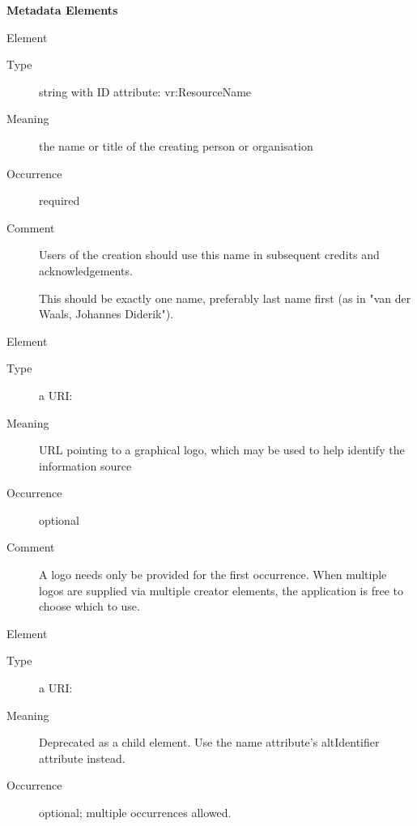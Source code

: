 \documentclass[11pt,a4paper]{ivoa}
\begin{document}
\begin{generated}
\begin{bigdescription}
\end{bigdescription}\endgroup



\vspace{0.5ex}\noindent\textbf{ Metadata Elements}

\begingroup\small\begin{bigdescription}\item[Element \xmlel{name}]
\begin{description}
\item[Type] string with ID attribute: vr:ResourceName
\item[Meaning]
                  the name or title of the creating person or organisation

\item[Occurrence] required
\item[Comment]
                  Users of the creation should use this name in
                  subsequent credits and acknowledgements.

                  This should be exactly one name, preferably last name
                  first (as in {"}van der Waals, Johannes Diderik{"}).


\end{description}
\item[Element \xmlel{logo}]
\begin{description}
\item[Type] a URI: 
\item[Meaning]
                URL pointing to a graphical logo, which may be used to help
                identify the information source

\item[Occurrence] optional
\item[Comment]
                A logo needs only be provided for the first occurrence.
                When multiple logos are supplied via multiple creator
                elements, the application is free to choose which to
                use.


\end{description}
\item[Element \xmlel{altIdentifier}]
\begin{description}
\item[Type] a URI: 
\item[Meaning]
              	Deprecated as a child element.  Use the name
              	attribute's altIdentifier attribute instead.

\item[Occurrence] optional; multiple occurrences allowed.

\end{description}


\end{bigdescription}\endgroup

\endgroup
\end{generated}
\end{document}
